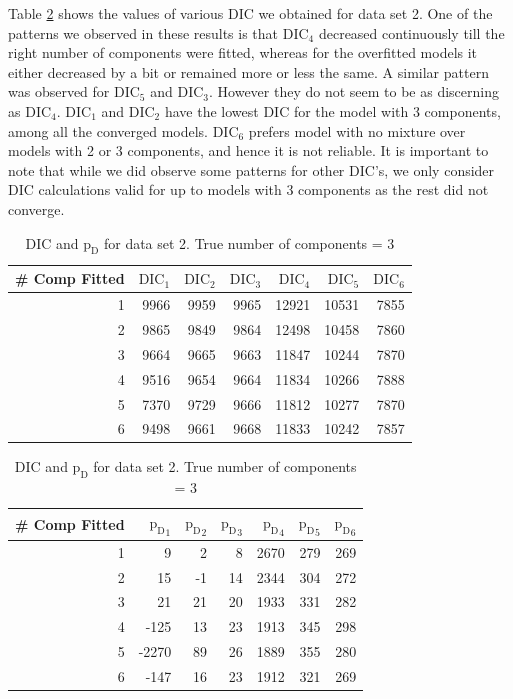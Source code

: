 Table \ref{table : ds_3wellsep_dic} shows the values of various DIC we obtained for data set 2. One of the patterns we observed in these results is that $\text{DIC}_4$ decreased continuously till the right number of components were fitted, whereas for the overfitted models it either decreased by a bit or remained more or less the same. A similar pattern was observed for $\text{DIC}_5$ and $\text{DIC}_3$. However they do not seem to be as discerning as $\text{DIC}_4$. $\text{DIC}_1$ and $\text{DIC}_2$ have the lowest DIC for the model with 3 components, among all the converged models. $\text{DIC}_6$ prefers model with no mixture over models with 2 or 3 components, and hence it is not reliable. It is important to note that while we did observe some patterns for other DIC's, we only consider DIC calculations valid for up to models with 3 components as the rest did not converge.\\

\begin{table}[!htb]
\centering
\captionsetup{justification=centering}
\caption{DIC and $\text{p}_\text{D}$ for data set 2. True number of components = 3}
\label{table : ds_3wellsep_dic} 
\begin{tabular}{@{}rrrrrrr@{}}
\toprule
\# Comp Fitted & $\text{DIC}_1$ & $\text{DIC}_2$  & $\text{DIC}_3$  & $\text{DIC}_4$  & $\text{DIC}_5$  & $\text{DIC}_6$  \\ \midrule
1 & 9966 & 9959 & 9965 & 12921 & 10531 & 7855 \\
2 & 9865 & 9849 & 9864 & 12498 & 10458 & 7860 \\
3 & 9664 & 9665 & 9663 & 11847 & 10244 & 7870 \\
4 & 9516 & 9654 & 9664 & 11834 & 10266 & 7888 \\
5 & 7370 & 9729 & 9666 & 11812 & 10277 & 7870 \\
6 & 9498 & 9661 & 9668 & 11833 & 10242 & 7857 \\ \bottomrule
\end{tabular}

\begin{tabular}{@{}rrrrrrr@{}}
\toprule
\# Comp Fitted & ${\text{p}_\text{D}}_1$ & ${\text{p}_\text{D}}_2$ & ${\text{p}_\text{D}}_3$ & ${\text{p}_\text{D}}_4$ & ${\text{p}_\text{D}}_5$ & ${\text{p}_\text{D}}_6$ \\ \midrule
1 & 9 & 2 & 8 & 2670 & 279 & 269 \\
2 & 15 & -1 & 14 & 2344 & 304 & 272 \\
3 & 21 & 21 & 20 & 1933 & 331 & 282 \\
4 & -125 & 13 & 23 & 1913 & 345 & 298 \\
5 & -2270 & 89 & 26 & 1889 & 355 & 280 \\
6 & -147 & 16 & 23 & 1912 & 321 & 269 \\ \bottomrule
\end{tabular}
\end{table}

